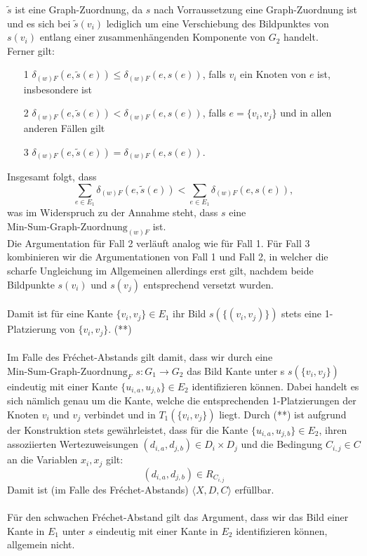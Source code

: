 \documentclass[a4paper, 12pt, twoside]{article}
\theoremstyle{Format1} %
\begin{document}
$\tilde{s}$ ist eine Graph-Zuordnung, da $s$ nach Vorraussetzung eine Graph-Zuordnung ist und es sich bei $\tilde{s}(v_i)$ lediglich um eine Verschiebung
des Bildpunktes von $s(v_i)$ entlang einer zusammenhängenden Komponente von $G_2$ handelt.
\\
Ferner gilt:
\begin{enumerate}
	\item[1] $\delta_{(w)F}(e, \tilde{s}(e)) \leq \delta_{(w)F}(e, s(e))$, falls $v_i$ ein Knoten von $e$ ist, insbesondere ist
	\item[2] $\delta_{(w)F}(e, \tilde{s}(e)) < \delta_{(w)F}(e, s(e))$, falls $e = \{v_i, v_j\}$ und in allen anderen Fällen gilt
	\item[3] $\delta_{(w)F}(e, \tilde{s}(e)) = \delta_{(w)F}(e, s(e))$.
\end{enumerate}
Insgesamt folgt, dass
$$\sum_{{e}\in E_1} \delta_{(w)F}(e, \tilde{s}(e)) < \sum_{{e}\in E_1} \delta_{(w)F}(e, s(e)),$$
was im Widerspruch zu der Annahme steht, dass $s$ eine $\text{Min-Sum-Graph-Zuordnung}_{(w)F}$ ist.
\\
Die Argumentation für Fall 2 verläuft analog wie für Fall 1.
Für Fall 3 kombinieren wir die Argumentationen von Fall 1 und Fall 2, in welcher die scharfe Ungleichung im Allgemeinen allerdings erst gilt,
nachdem beide Bildpunkte $s(v_i)$ und $s(v_j)$ entsprechend versetzt wurden.
\\
\\
Damit ist für eine Kante $\{v_i, v_j\} \in E_1$ ihr Bild $s(\{(v_i, v_j)\})$ stets eine 1-Platzierung von $\{v_i, v_j\}$. (**)
\\
\\
Im Falle des Fréchet-Abstands gilt damit, dass wir durch eine $\text{Min-Sum-Graph-Zuordnung}_F$ $s: G_1 \to G_2$ das Bild Kante unter s
$s(\{v_i, v_j\})$ eindeutig mit einer Kante $\{u_{i,a}, u_{j,b}\} \in E_2$ identifizieren können. Dabei handelt es sich nämlich genau um die Kante, welche
die entsprechenden 1-Platzierungen der Knoten $v_i$ und $v_j$ verbindet und in $T_1(\{v_i, v_j\})$ liegt.
Durch (**) ist aufgrund der Konstruktion stets gewährleistet, dass für die Kante $\{u_{i,a}, u_{j,b}\} \in E_2$, ihren assoziierten Wertezuweisungen $(d_{i,a}, d_{j,b}) \in D_i \times D_j$
und die Bedingung $C_{i,j} \in C$ an die Variablen $x_i, x_j$ gilt:
$$(d_{i,a},d_{j,b}) \in R_{C_{i,j}}$$
Damit ist (im Falle des Fréchet-Abstands) $\langle X,D,C \rangle$ erfüllbar.
\\
\\
Für den schwachen Fréchet-Abstand gilt das Argument, dass wir das Bild einer Kante in $E_1$ unter $s$ eindeutig mit einer Kante in $E_2$ identifizieren können, allgemein nicht.
\end{document}
